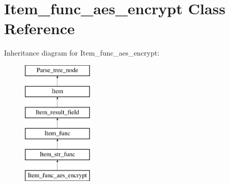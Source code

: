\hypertarget{classItem__func__aes__encrypt}{}\section{Item\+\_\+func\+\_\+aes\+\_\+encrypt Class Reference}
\label{classItem__func__aes__encrypt}
Inheritance diagram for Item\+\_\+func\+\_\+aes\+\_\+encrypt\+:\begin{figure}[H]
\begin{center}
\leavevmode
\includegraphics[height=6.000000cm]{classItem__func__aes__encrypt}
\end{center}
\end{figure}
